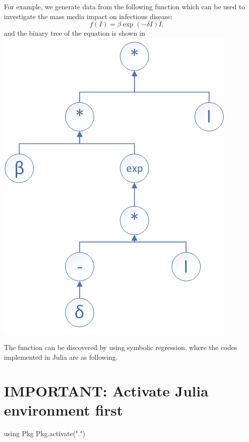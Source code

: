 \documentclass[
  letterpaper,
  DIV=11,
  numbers=noendperiod]{scrreport}
\newenvironment{Shaded}{\begin{snugshade}}{\end{snugshade}}
\newcommand{\BuiltInTok}[1]{\textcolor[rgb]{0.00,0.23,0.31}{#1}}
\newcommand{\FunctionTok}[1]{\textcolor[rgb]{0.28,0.35,0.67}{#1}}
\newcommand{\ImportTok}[1]{\textcolor[rgb]{0.00,0.46,0.62}{#1}}
\newcommand{\NormalTok}[1]{\textcolor[rgb]{0.00,0.23,0.31}{#1}}
\newcommand{\StringTok}[1]{\textcolor[rgb]{0.13,0.47,0.30}{#1}}
\begin{document}
For example, we generate data from the following function which can be
used to investigate the mass media impact on infectious disease:
\[ f(I) = \beta \exp(-\delta I)I,\] and the binary tree of the equation
is shown in \includegraphics{./symbolictree.png}

The function can be discovered by using symbolic regression, where the
codes implemented in Julia are as following.

\section{IMPORTANT: Activate Julia environment
first}\label{important-activate-julia-environment-first-3}

\begin{Shaded}
\begin{Highlighting}[]
\ImportTok{using} \BuiltInTok{Pkg}
\BuiltInTok{Pkg}\NormalTok{.}\FunctionTok{activate}\NormalTok{(}\StringTok{"."}\NormalTok{)}
\end{Highlighting}
\end{Shaded}
\end{document}
